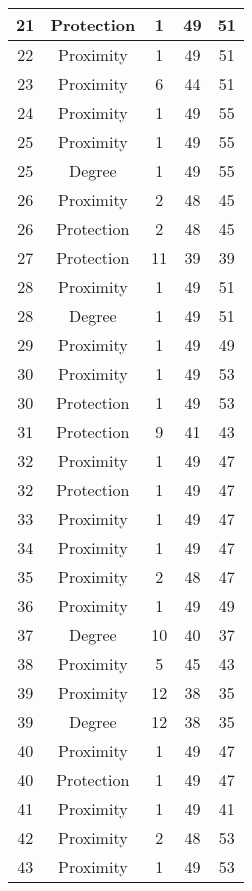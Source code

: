 \documentclass[results.tex]{subfiles}
\begin{document}
\begin{center}
\begin{tabular}{| c || c | c | c | c |}
    \hline
    21 & Protection & 1 & 49 & 51 \\ 
    \hline
    22 & Proximity & 1 & 49 & 51 \\ 
    \hline
    23 & Proximity & 6 & 44 & 51 \\ 
    \hline
    24 & Proximity & 1 & 49 & 55 \\ 
    \hline
    25 & Proximity & 1 & 49 & 55 \\ 
    \hline
    25 & Degree & 1 & 49 & 55 \\ 
    \hline
    26 & Proximity & 2 & 48 & 45 \\ 
    \hline
    26 & Protection & 2 & 48 & 45 \\ 
    \hline
    27 & Protection & 11 & 39 & 39 \\ 
    \hline
    28 & Proximity & 1 & 49 & 51 \\ 
    \hline
    28 & Degree & 1 & 49 & 51 \\ 
    \hline
    29 & Proximity & 1 & 49 & 49 \\ 
    \hline
    30 & Proximity & 1 & 49 & 53 \\ 
    \hline
    30 & Protection & 1 & 49 & 53 \\ 
    \hline
    31 & Protection & 9 & 41 & 43 \\ 
    \hline
    32 & Proximity & 1 & 49 & 47 \\ 
    \hline
    32 & Protection & 1 & 49 & 47 \\ 
    \hline
    33 & Proximity & 1 & 49 & 47 \\ 
    \hline
    34 & Proximity & 1 & 49 & 47 \\ 
    \hline
    35 & Proximity & 2 & 48 & 47 \\ 
    \hline
    36 & Proximity & 1 & 49 & 49 \\ 
    \hline
    37 & Degree & 10 & 40 & 37 \\ 
    \hline
    38 & Proximity & 5 & 45 & 43 \\ 
    \hline
    39 & Proximity & 12 & 38 & 35 \\ 
    \hline
    39 & Degree & 12 & 38 & 35 \\ 
    \hline
    40 & Proximity & 1 & 49 & 47 \\ 
    \hline
    40 & Protection & 1 & 49 & 47 \\ 
    \hline
    41 & Proximity & 1 & 49 & 41 \\ 
    \hline
    42 & Proximity & 2 & 48 & 53 \\ 
    \hline
    43 & Proximity & 1 & 49 & 53 \\ 

\end{tabular}
\end{center}
\end{document}
